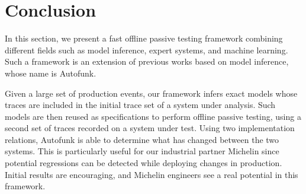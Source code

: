 \section{Conclusion}
\label{sec:testing:conclusion}

In this section, we present a fast offline passive testing
framework combining different fields such as model inference,
expert systems, and machine learning. Such a framework is an
extension of previous works based on model inference, whose name
is Autofunk.

Given a large set of production events, our framework infers
exact models whose traces are included in the initial trace set
of a system under analysis.  Such models are then reused as
specifications to perform offline passive testing, using a second
set of traces recorded on a system under test.  Using two
implementation relations, Autofunk is able to determine what has
changed between the two systems. This is particularly useful for
our industrial partner Michelin since potential regressions can
be detected while deploying changes in production. Initial
results are encouraging, and Michelin engineers see a real
potential in this framework.
